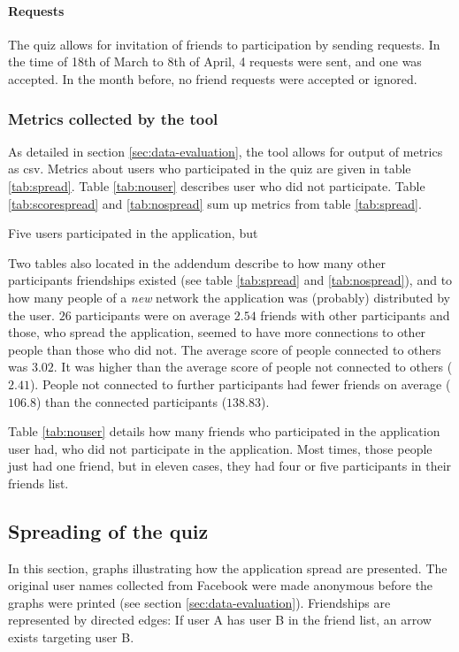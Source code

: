 \documentclass[preprint,12pt]{elsarticle}
\begin{document}
\paragraph{Requests}
The quiz allows for invitation of friends to participation by sending
requests. In the time of 18th of March to 8th of April, 4 requests
were sent, and one was accepted. In the month before, no friend
requests were accepted or ignored.

\subsubsection{Metrics collected by the tool}
As detailed in section \ref{sec:data-evaluation}, the tool allows for
output of metrics as \ac{csv}. Metrics about users who participated in
the quiz are given in table
\ref{tab:spread}. Table \ref{tab:nouser}
describes user who did not participate. Table \ref{tab:scorespread}
and \ref{tab:nospread} sum up metrics from table \ref{tab:spread}.

Five users participated in the application, but 

Two tables also located in the addendum describe to how many
other participants friendships existed (see table \ref{tab:spread} and
\ref{tab:nospread}), and to how many people of a
\textit{new} network the application was (probably) distributed by the
user. $26$ participants were on average $2.54$ friends with other
participants and those, who spread the application, seemed to have
more connections to other people than those who did not.
The average score of people connected to others was $3.02$. It was
higher than the average score of people not connected to others ($2.41$).
People not connected to further participants had fewer friends on average ($106.8$)
than the connected participants ($138.83$).

Table \ref{tab:nouser} details how many friends who participated in
the application user had, who did not participate in the
application. Most times, those people just had one friend, but in eleven
cases, they had four or five participants in their friends list.


\subsection{Spreading of the quiz}
\label{sec:distribution-quiz}
In this section, graphs illustrating how the
application spread are presented. The original user names collected from Facebook were made anonymous
before the graphs were printed (see section \ref{sec:data-evaluation}). Friendships are
represented by directed edges: If user A has user B in the friend list, an
arrow exists targeting user B.
\end{document}
